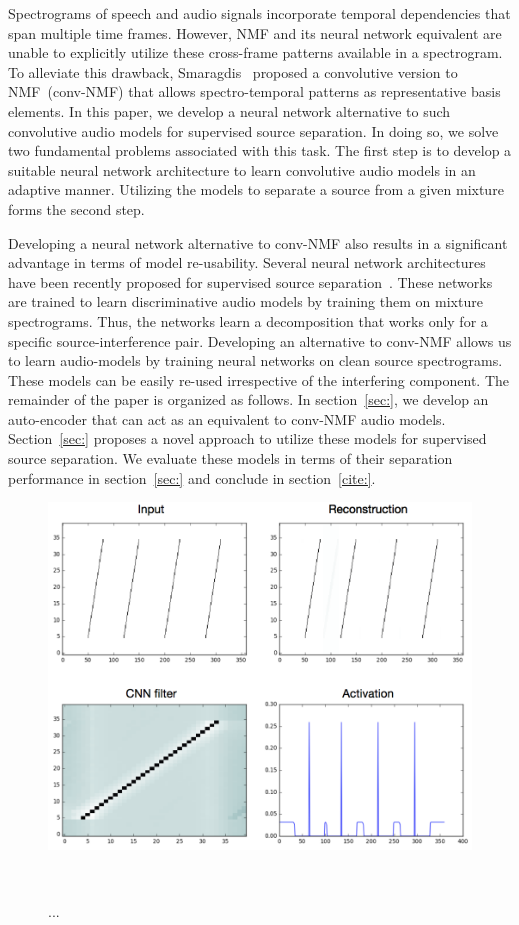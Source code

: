 \documentclass{article}
\begin{document}
Spectrograms of speech and audio signals incorporate temporal dependencies that span multiple time frames. However, NMF and its neural network equivalent are unable to explicitly utilize these cross-frame patterns available in a spectrogram. To alleviate this drawback, Smaragdis~\cite{smaragdis2007convolutive} proposed a convolutive version to NMF~(conv-NMF) that allows spectro-temporal patterns as representative basis elements. In this paper, we develop a neural network alternative to such convolutive audio models for supervised source separation. In doing so, we solve two fundamental problems associated with this task. The first step is to develop a suitable neural network architecture to learn convolutive audio models in an adaptive manner. Utilizing the models to separate a source from a given mixture forms the second step. 

Developing a neural network alternative to conv-NMF also results in a significant advantage in terms of model re-usability. Several neural network architectures have been recently proposed for supervised source separation~\cite{grais2017single, venkataramani2017end}. These networks are trained to learn discriminative audio models by training them on mixture spectrograms. Thus, the networks learn a decomposition that works only for a specific source-interference pair. Developing an alternative to conv-NMF allows us to learn audio-models by training neural networks on clean source spectrograms. These models can be easily re-used irrespective of the interfering component. The remainder of the paper is organized as follows. In section~\ref{sec:}, we develop an auto-encoder that can act as an equivalent to conv-NMF audio models. Section~\ref{sec:} proposes a novel approach to utilize these models for supervised source separation. We evaluate these models in terms of their separation performance in section~\ref{sec:} and conclude in section~\ref{cite:}.

\begin{figure}[t]
\centering
  \includegraphics[clip, trim = 0cm 0cm 0cm 0cm, width=\linewidth]{Figs/CNN_demo.png}
  \caption{...}~\label{fig:cnn_demo}
\end{figure}
\end{document}

